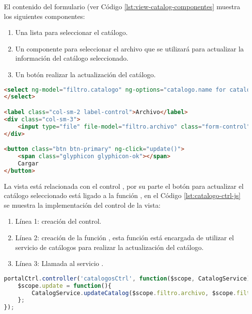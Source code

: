 El contenido del formulario (ver Código \ref{lst:view-catalog-componentes} muestra los siguientes componentes:
\begin{enumerate}
	\item Una lista para seleccionar el catálogo.
	\item Un componente para seleccionar el archivo que se utilizará para actualizar la información del catálogo seleccionado.
	\item Un botón realizar la actualización del catálogo.
\end{enumerate}
\begin{lstlisting}[language=HTML, captionpos=b, caption={Componentes del formulario para seleccionar catálogo.}, label={lst:view-catalog-componentes}]
<select ng-model="filtro.catalogo" ng-options="catalogo.name for catalogo in catalogos" class="form-control">
</select>

<label class="col-sm-2 label-control">Archivo</label>
<div class="col-sm-3">
	<input type="file" file-model="filtro.archivo" class="form-control"/>
</div>

<button class="btn btn-primary" ng-click="update()">
	<span class="glyphicon glyphicon-ok"></span>
	Cargar
</button>
\end{lstlisting}

La vista está relacionada con el control , por su parte el botón para actualizar el catálogo seleccionado está ligado a la función , en el Código \ref{lst:catalogo-ctrl-js} se muestra la implementación del control de la vista:

\begin{enumerate}
	\item Línea 1: creación del control. 
	\item Línea 2: creación de la función , esta función está encargada de utilizar el servicio de catálogos para realizar la actualización del catálogo.
	\item Línea 3: Llamada al servicio .
\end{enumerate}

\begin{lstlisting}[language=Javascript, caption={Controlador de la vista Catálogo.}, captionpos=b, label={lst:catalogo-ctrl-js}]
portalCtrl.controller('catalogosCtrl', function($scope, CatalogService){
	$scope.update = function(){
		CatalogService.updateCatalog($scope.filtro.archivo, $scope.filtro.catalogo.name);
	};
});

\end{lstlisting}



